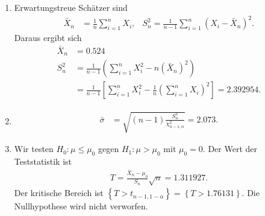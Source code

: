 \solution
\begin{enumerate}
    \item Erwartungstreue Schätzer sind
        \begin{align*}
            \bar X_n &= \frac{1}{n} \sum_{i=1}^{n} X_i, & S^2_n = \frac{1}{n-1} \sum_{i=1}^{n} \left( X_i - \bar X_n \right)^2.
        \end{align*}
        Daraus ergibt sich
        \begin{align*}
            \bar X_n &= 0.524  \\
            S^2_n &= \frac{1}{n-1} \left( \sum_{i=1}^{n} X_i^2 - n \left( \bar X_n \right)^2 \right) \\
            &= \frac{1}{n-1} \left[  \sum_{i=1}^{n} X_i^{2 } - \frac{1}{n} \left( \sum_{i=1}^{n} X_i \right)^2 \right] = 2.392954. 
        \end{align*}
    \item
        \begin{align*}
            \bar \sigma &= \sqrt{ (n-1) \frac{S^2_n}{\chi^{2}_{n-1, \alpha}} } = 2.073. 
        \end{align*}
    \item Wir testen $H_0: \mu \leq \mu_0$ gegen $H_1: \mu>\mu_0$ mit
        $\mu_0=0$. Der Wert der Teststatistik ist
        \begin{align*}
            T = \frac{\bar X_n - \mu_0}{S_n} \sqrt{n} = 1.311927. 
        \end{align*}
        Der kritische Bereich ist $\left\{ T > t_{n-1, 1-\alpha}\right\}=
        \left\{ T > 1.76131 \right\}$. Die Nullhypothese wird nicht verworfen.
\end{enumerate}

